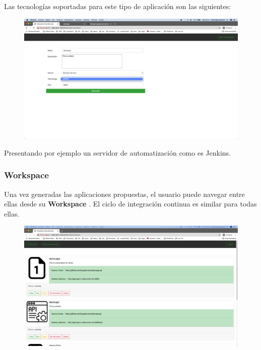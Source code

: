 \documentclass[a4paper,11pt]{book}
\begin{document}
Las tecnologías soportadas para este tipo de aplicación son las siguientes: 

\begin{figure}[H]
\centering
\includegraphics[scale=0.2]{imagenes/casouso/21.png}
\caption{   }
\end{figure}

Presentando por ejemplo un servidor de automatización como es Jenkins. 

\subsubsection{Workspace}

Una vez generadas las aplicaciones propuestas, el usuario puede navegar entre ellas desde su \textbf{Workspace} . El ciclo de integración continua es similar para todas ellas. 
\begin{figure}[H]
\centering
\includegraphics[scale=0.2]{imagenes/casouso/1_1.png}
\caption{   }
\end{figure}
\end{document}
